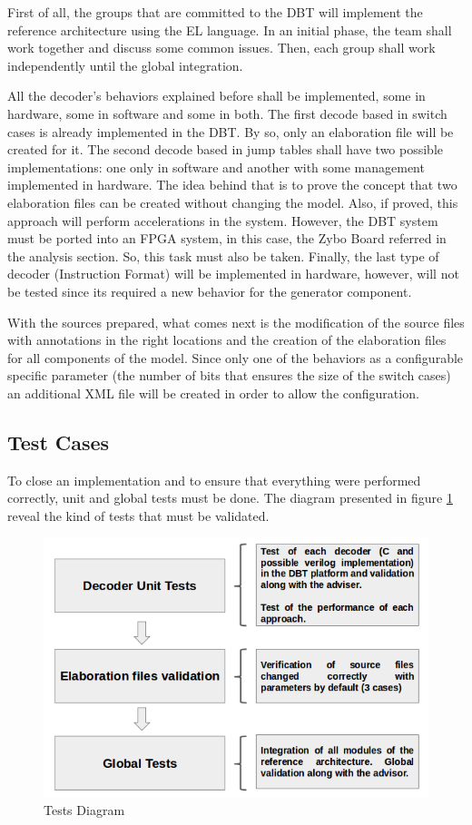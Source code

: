 \documentclass[12pt]{article}
\begin{document}
{First of all, the groups that are committed to the DBT will implement the reference architecture using the EL language. In an initial phase, the team shall work together and discuss some common issues. Then, each group shall work independently until the global integration. 

All the decoder's behaviors explained before shall be implemented, some in hardware, some in software and some in both. The first decode based in switch cases is already implemented in the DBT. By so, only an elaboration file will be created for it. The second decode based in jump tables shall have two possible implementations: one only in software and another with some management implemented in hardware. The idea behind that is to prove the concept that two elaboration files can be created without changing the model. Also, if proved, this approach will perform accelerations in the system. However, the DBT system must be ported into an FPGA system, in this case, the Zybo Board referred in the analysis section. So, this task must also be taken. Finally, the last type of decoder (Instruction Format) will be implemented in hardware, however, will not be tested since its required a new behavior for the generator component. 

With the sources prepared, what comes next is the modification of the source files with annotations in the right locations and the creation of the elaboration files for all components of the model. Since only one of the behaviors as a configurable specific parameter (the number of bits that ensures the size of the switch cases) an additional XML file will be created in order to allow the configuration. 


\subsection{Test Cases}
To close an implementation and to ensure that everything were performed correctly, unit and global tests must be done. The diagram presented in figure \ref{fig:tests} reveal the kind of tests that must be validated. 

\begin{figure}[H]
\centerline{
\includegraphics[scale=0.55]{images/tests}
}
\caption{Tests Diagram}
\label{fig:tests} 
\end{figure}

}
\end{document}
